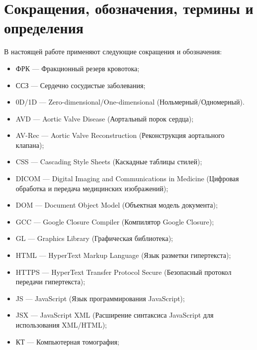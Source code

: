 \chapter*{Сокращения, обозначения, термины 
и определения}

В настоящей работе применяют следующие сокращения и обозначения:
\begin{itemize}

\item ФРК --- Фракционный резерв кровотока;

\item ССЗ --- Сердечно сосудистые заболевания;

\item 0D/1D --- Zero-dimensional/One-dimensional (Нольмерный/Одномерный).

\iffalse
\item AVD --- Aortic Valve Disease (Аортальный порок сердца);

\item AV-Rec --- Aortic Valve Reconstruction (Реконструкция аортального клапана);

\item CSS --- Cascading Style Sheets (Каскадные таблицы стилей);

\item DICOM --- Digital Imaging and Communications in Medicine (Цифровая обработка и передача медицинских изображений);

\item DOM --- Document Object Model (Объектная модель документа);

\item GCC --- Google Closure Compiler (Компилятор Google Closure);

\item GL --- Graphics Library (Графическая библиотека);

\item HTML --- HyperText Markup Language (Язык разметки гипертекста);

\item HTTPS --- HyperText Transfer Protocol Secure (Безопасный протокол передачи гипертекста);

\item JS --- JavaScript (Язык программирования JavaScript);

\item JSX --- JavaScript XML (Расширение синтаксиса JavaScript для использования XML/HTML);

\item КТ --- Компьютерная томография;


\end{itemize}
